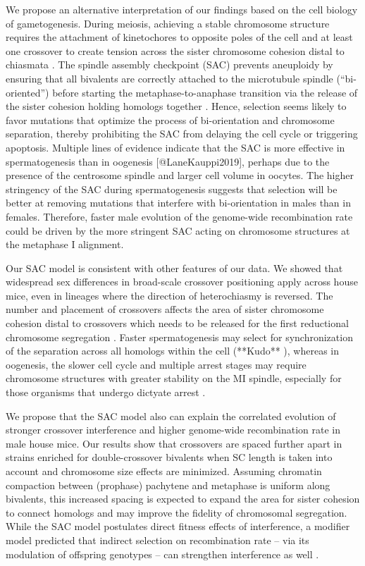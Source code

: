 \documentclass[9pt,lineno]{elife}
\begin{document}
We propose an alternative interpretation of our findings based on the cell biology of gametogenesis. During meiosis, achieving a stable chromosome structure requires the attachment of kinetochores to opposite poles of the cell and at least one crossover to create tension across the sister chromosome cohesion distal to chiasmata \citep{LaneKauppi2019, vanVeen2003}. The spindle assembly checkpoint (SAC) prevents aneuploidy by ensuring that all bivalents are correctly attached to the microtubule spindle (“bi-oriented”) before starting the metaphase-to-anaphase transition via the release of the sister cohesion holding homologs together \citep{LaneKauppi2019}. Hence, selection seems likely to favor mutations that optimize the process of bi-orientation and chromosome separation, thereby prohibiting the SAC from delaying the cell cycle or triggering apoptosis. Multiple lines of evidence indicate that the SAC is more effective in spermatogenesis than in oogenesis [@LaneKauppi2019], perhaps due to the presence of the centrosome spindle \citep{So2019} and larger cell volume \citep{kyogoku2017} in oocytes. The higher stringency of the SAC during spermatogenesis suggests that selection will be better at removing mutations that interfere with bi-orientation in males than in females. Therefore, faster male evolution of the genome-wide recombination rate could be driven by the more stringent SAC acting on chromosome structures at the metaphase I alignment.


Our SAC model is consistent with other features of our data. We showed that widespread sex differences in broad-scale crossover positioning \citep{sardell_sex_2020} apply across house mice, even in lineages where the direction of heterochiasmy is reversed. The number and placement of crossovers affects the area of sister chromosome cohesion distal to crossovers which needs to be released for the first reductional chromosome segregation \citep{vanVeen2003, LaneKauppi2019, subramanian2014, dumontDesai2012}. Faster spermatogenesis may select for synchronization of the separation across all homologs within the cell (**Kudo** ), whereas in oogenesis, the slower cell cycle and multiple arrest stages may require chromosome structures with greater stability on the MI spindle, especially for those organisms that undergo dictyate arrest \citep{Lee2019}.

We propose that the SAC model also can explain the correlated evolution of stronger crossover interference and higher genome-wide recombination rate in male house mice. Our results show that crossovers are spaced further apart in strains enriched for double-crossover bivalents when SC length is taken into account and chromosome size effects are minimized. Assuming chromatin compaction between (prophase) pachytene and metaphase is uniform along bivalents, this increased spacing is expected to expand the area for sister cohesion to connect homologs and may improve the fidelity of chromosomal segregation. While the SAC model postulates direct fitness effects of interference, a modifier model predicted that indirect selection on recombination rate – via its modulation of offspring genotypes – can strengthen interference as well \citep{goldstein1993}.
\end{document}
